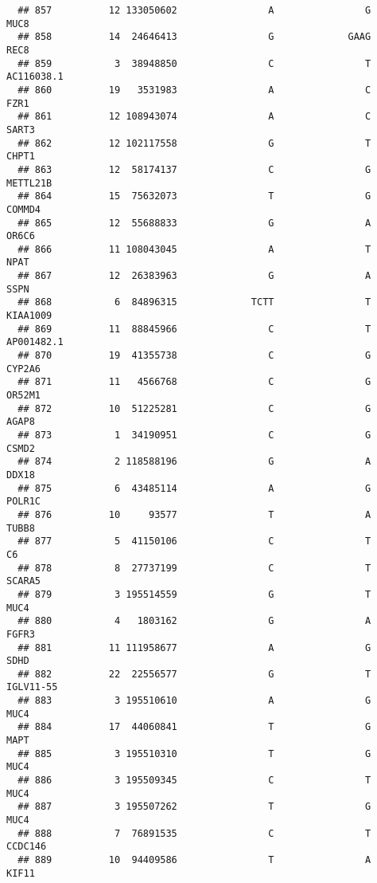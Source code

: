 \documentclass[12pt,twoside]{reedthesis}
\theoremstyle{definition}
\theoremstyle{definition}
\theoremstyle{remark}
\begin{document}
\begin{verbatim}
  ## 857          12 133050602                A                G           MUC8
  ## 858          14  24646413                G             GAAG           REC8
  ## 859           3  38948850                C                T     AC116038.1
  ## 860          19   3531983                A                C           FZR1
  ## 861          12 108943074                A                C          SART3
  ## 862          12 102117558                G                T          CHPT1
  ## 863          12  58174137                C                G       METTL21B
  ## 864          15  75632073                T                G         COMMD4
  ## 865          12  55688833                G                A          OR6C6
  ## 866          11 108043045                A                T           NPAT
  ## 867          12  26383963                G                A           SSPN
  ## 868           6  84896315             TCTT                T       KIAA1009
  ## 869          11  88845966                C                T     AP001482.1
  ## 870          19  41355738                C                G         CYP2A6
  ## 871          11   4566768                C                G         OR52M1
  ## 872          10  51225281                C                G          AGAP8
  ## 873           1  34190951                C                G          CSMD2
  ## 874           2 118588196                G                A          DDX18
  ## 875           6  43485114                A                G         POLR1C
  ## 876          10     93577                T                A          TUBB8
  ## 877           5  41150106                C                T             C6
  ## 878           8  27737199                C                T         SCARA5
  ## 879           3 195514559                G                T           MUC4
  ## 880           4   1803162                G                A          FGFR3
  ## 881          11 111958677                A                G           SDHD
  ## 882          22  22556577                G                T      IGLV11-55
  ## 883           3 195510610                A                G           MUC4
  ## 884          17  44060841                T                G           MAPT
  ## 885           3 195510310                T                G           MUC4
  ## 886           3 195509345                C                T           MUC4
  ## 887           3 195507262                T                G           MUC4
  ## 888           7  76891535                C                T        CCDC146
  ## 889          10  94409586                T                A          KIF11

\end{verbatim}
\end{document}
